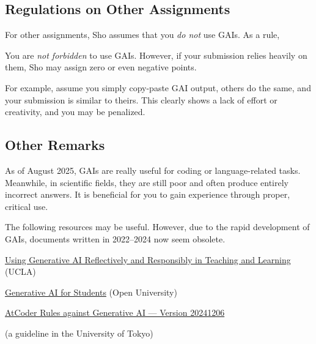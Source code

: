 \documentclass[11pt,pdfa,lastpage,minititle]{MishoNote}
\begin{document}
\subsection*{Regulations on Other Assignments}
For other assignments, Sho assumes that you \emph{do not} use GAIs. As a rule,
\begin{miniitemize}
 \item You are \emph{not forbidden} to use GAIs. However, if your submission relies heavily on them, Sho may assign zero or even negative points.
\end{miniitemize}
For example, assume you simply copy-paste GAI output, others do the same, and your submission is similar to theirs. This clearly shows a lack of effort or creativity, and you may be penalized.

\subsection*{Other Remarks}
As of August 2025, GAIs are really useful for coding or language-related tasks.
Meanwhile, in scientific fields, they are still poor and often produce entirely incorrect answers.
It is beneficial for you to gain experience through proper, critical use.

The following resources may be useful. However, due to the rapid development of GAIs, documents written in 2022--2024 now seem obsolete.
\begin{miniitemize}
 \item \href{https://teaching.ucla.edu/resources/teaching-guides/using-generative-ai-reflectively-and-responsibly-in-teaching-and-learning/}{Using Generative AI Reflectively and Responsibly in Teaching and Learning} (UCLA)
 \item \href{https://about.open.ac.uk/policies-and-reports/policies-and-statements/gen-ai/generative-ai-students}{Generative AI for Students} (Open University)
 \item \href{https://info.atcoder.jp/entry/llm-rules-en}{AtCoder Rules against Generative AI --- Version 20241206}
 \item \href{https://utelecon.adm.u-tokyo.ac.jp/docs/ai-tools-in-classes}{} (a guideline in the University of Tokyo)
\end{miniitemize}
\OutputNote
\end{document}
